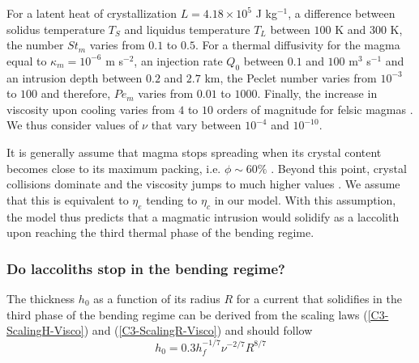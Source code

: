 For a latent heat of crystallization $L = 4.18\times10^5$ J kg$^{-1}$,
a   difference  between   solidus  temperature   $T_S$  and   liquidus
temperature  $T_L$ between  $100$ K  and  $300$ K,  the number  $St_m$
varies from $0.1$  to $0.5$.  For a thermal diffusivity  for the magma
equal  to $\kappa_m=  10^{-6}$  m s$^{-2}$,  an  injection rate  $Q_0$
between $0.1$ and $100$ m$^3$  s$^{-1}$ and an intrusion depth between
$0.2$ and $2.7$  km, the Peclet number varies from  $10^{-3}$ to $100$
and  therefore, $Pe_m$  varies from  $0.01$ to  $1000$.  Finally,  the
increase in viscosity  upon cooling varies from $4$ to  $10$ orders of
magnitude               for                felsic               magmas
\citep{Anonymous:CZVBrBvv,Lejeune:1995fc,Giordano:2008em,Diniega:2013eh}.
We  thus consider  values of  $\nu$  that vary  between $10^{-4}$  and
$10^{-10}$.

It is  generally assume  that magma stops  spreading when  its crystal
content becomes close  to its maximum packing, i.e.   $\phi \sim 60\%$
\citep{Pinkerton:1992fw}.   Beyond  this   point,  crystal  collisions
dominate   and   the   viscosity   jumps   to   much   higher   values
\citep{Lejeune:1995fc,Giordano:2008em}.   We   assume  that   this  is
equivalent to  $\eta_e$ tending to  $\eta_c$ in our model.   With this
assumption, the  model thus predicts  that a magmatic  intrusion would
solidify as a  laccolith upon reaching the third thermal  phase of the
bending regime.

\subsubsection*{Do laccoliths stop in the bending regime?}
\label{C4-sec:range-valu-dimens}

The thickness $h_0$ as a function of its radius $R$ for a current that
solidifies in  the third phase  of the  bending regime can  be derived
from     the     scaling    laws     (\ref{C3-ScalingH-Visco})     and
(\ref{C3-ScalingR-Visco}) and should follow
\begin{equation}
  h_0 = 0.3 h_f^{-1/7}\nu^{-2/7}R^{8/7}\label{C4-Hr}
\end{equation}

